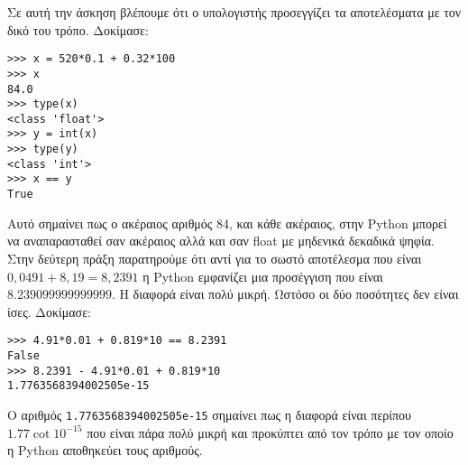 Σε αυτή την άσκηση βλέπουμε ότι ο υπολογιστής προσεγγίζει τα αποτελέσματα με τον δικό του τρόπο.
Δοκίμασε:
\begin{lstlisting}
>>> x = 520*0.1 + 0.32*100
>>> x
84.0
>>> type(x)
<class 'float'>
>>> y = int(x)
>>> type(y)
<class 'int'>
>>> x == y
True
\end{lstlisting}
Αυτό σημαίνει πως ο ακέραιος αριθμός 84, και κάθε ακέραιος, στην Python μπορεί να αναπαρασταθεί σαν ακέραιος αλλά και σαν float με μηδενικά δεκαδικά ψηφία.
Στην δεύτερη πράξη παρατηρούμε ότι αντί για το σωστό αποτέλεσμα που είναι $0,0491+8,19=8,2391$ η Python εμφανίζει μια προσέγγιση που είναι $8.239099999999999$. Η διαφορά είναι πολύ μικρή. Ωστόσο οι δύο ποσότητες δεν είναι ίσες.
Δοκίμασε:
\begin{lstlisting}
>>> 4.91*0.01 + 0.819*10 == 8.2391
False
>>> 8.2391 - 4.91*0.01 + 0.819*10 
1.7763568394002505e-15
\end{lstlisting}
Ο αριθμός \lstinline{1.7763568394002505e-15} σημαίνει πως η διαφορά είναι περίπου $1.77\cot 10^{-15}$ που είναι πάρα πολύ μικρή και προκύπτει από τον τρόπο με τον οποίο η Python αποθηκεύει τους αριθμούς.
